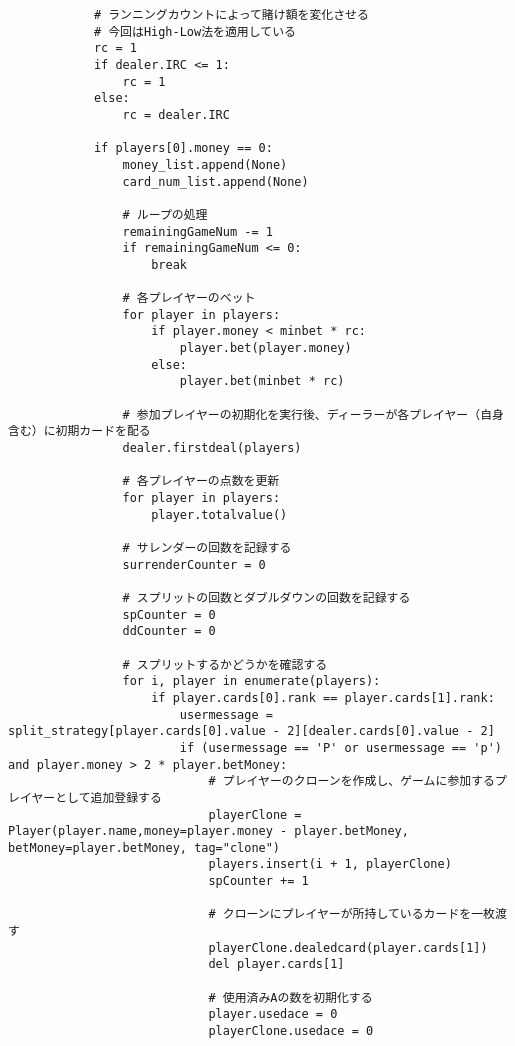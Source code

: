 \begin{itemize}
\begin{lstlisting}
            # ランニングカウントによって賭け額を変化させる
            # 今回はHigh-Low法を適用している
            rc = 1
            if dealer.IRC <= 1:
                rc = 1
            else:
                rc = dealer.IRC

            if players[0].money == 0:
                money_list.append(None)
                card_num_list.append(None)

                # ループの処理
                remainingGameNum -= 1
                if remainingGameNum <= 0:
                    break

                # 各プレイヤーのベット
                for player in players:
                    if player.money < minbet * rc:
                        player.bet(player.money)
                    else:
                        player.bet(minbet * rc)

                # 参加プレイヤーの初期化を実行後、ディーラーが各プレイヤー（自身含む）に初期カードを配る
                dealer.firstdeal(players)

                # 各プレイヤーの点数を更新
                for player in players:
                    player.totalvalue()

                # サレンダーの回数を記録する
                surrenderCounter = 0

                # スプリットの回数とダブルダウンの回数を記録する
                spCounter = 0
                ddCounter = 0

                # スプリットするかどうかを確認する
                for i, player in enumerate(players):
                    if player.cards[0].rank == player.cards[1].rank:
                        usermessage = split_strategy[player.cards[0].value - 2][dealer.cards[0].value - 2]
                        if (usermessage == 'P' or usermessage == 'p') and player.money > 2 * player.betMoney:
                            # プレイヤーのクローンを作成し、ゲームに参加するプレイヤーとして追加登録する
                            playerClone = Player(player.name,money=player.money - player.betMoney, betMoney=player.betMoney, tag="clone")
                            players.insert(i + 1, playerClone)
                            spCounter += 1

                            # クローンにプレイヤーが所持しているカードを一枚渡す
                            playerClone.dealedcard(player.cards[1])
                            del player.cards[1]

                            # 使用済みAの数を初期化する
                            player.usedace = 0
                            playerClone.usedace = 0


\end{lstlisting}
\end{itemize}
